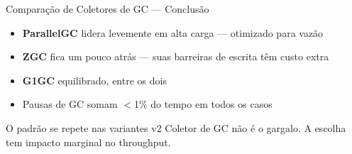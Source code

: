 \begin{frame}{Comparação de Coletores de GC --- Conclusão}
    \begin{itemize}
        \item \textbf{ParallelGC} lidera levemente em alta carga --- otimizado para vazão
        \item \textbf{ZGC} fica um pouco atrás --- suas barreiras de escrita têm custo extra
        \item \textbf{G1GC} equilibrado, entre os dois
        \item Pausas de GC somam \alert{$<$1\%} do tempo em todos os casos
    \end{itemize}

    \vspace{1em}
    \begin{block}{O padrão se repete nas variantes v2}
        Coletor de GC não é o gargalo. A escolha tem impacto marginal no throughput.
    \end{block}
\end{frame}
